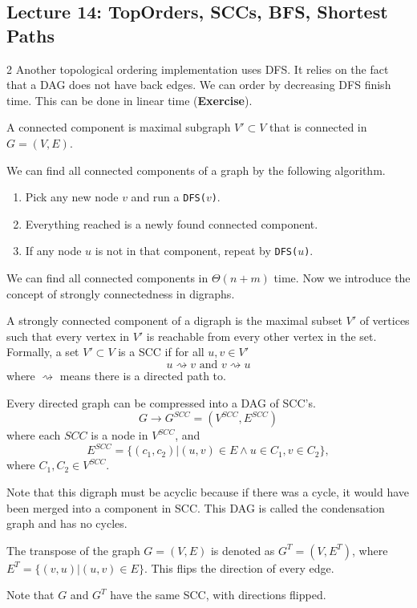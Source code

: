 \subsection{Lecture 14: TopOrders, SCCs, BFS, Shortest Paths}
\begin{multicols}{2}
    Another topological ordering implementation uses DFS. It relies on the fact that a DAG does not have back edges. We can order by decreasing DFS finish time. This can be done in linear time (\textbf{Exercise}). 
    \begin{definition}
    A connected component is maximal subgraph $V' \subset V$ that is connected in $G = (V, E)$. 
    \end{definition}
    We can find all connected components of a graph by the following algorithm. 
    \begin{enumerate}
        \item Pick any new node $v$ and run a \texttt{DFS($v$)}. 
        \item Everything reached is a newly found connected component. 
        \item If any node $u$ is not in that component, repeat by \texttt{DFS($u$)}. 
    \end{enumerate}
    We can find all connected components in $\Theta(n + m)$ time. Now we introduce the concept of strongly connectedness in digraphs. 
    \begin{definition}[SCC]
        A strongly connected component of a digraph is the maximal subset $V'$ of vertices such that every vertex in $V'$ is reachable from every other vertex in the set. Formally, a set $V' \subset V$ is a SCC if for all $u, v \in V'$
        $$
        u \rightsquigarrow v \textrm{ and } v \rightsquigarrow u
        $$
        where $\rightsquigarrow$ means there is a directed path to. 
    \end{definition}

    \begin{theorem}
        Every directed graph can be compressed into a DAG of SCC's. 
        $$
        G \to G^{SCC} = (V^{SCC}, E^{SCC})
        $$
        where each $SCC$ is a node in $V^{SCC}$, and 
        $$
        E^{SCC} = \{(c_1, c_2) | (u,v) \in E \land u \in C_1, v\in C_2\},
        $$
        where $C_1, C_2 \in V^{SCC}$. 
    \end{theorem}
    Note that this digraph must be acyclic because if there was a cycle, it would have been merged into a component in SCC. This DAG is called the condensation graph and has no cycles. 
    \begin{definition}[Transpose]
        The transpose of the graph $G = (V, E)$ is denoted as $G^T = (V, E^T)$, where $E^T = \{(v,u) | (u, v) \in E\}$. This flips the direction of every edge. 
    \end{definition}
    Note that $G$ and $G^T$ have the same SCC, with directions flipped. 
    

\end{multicols}
